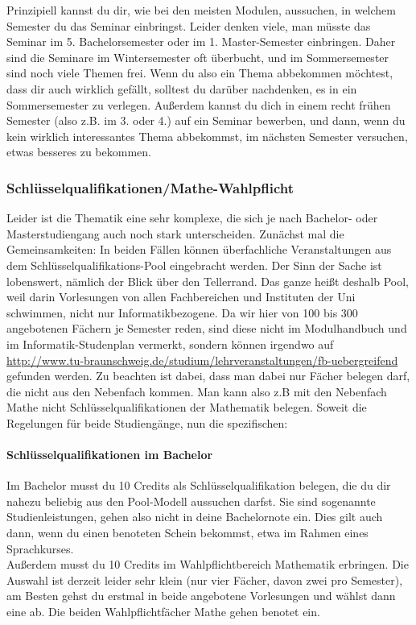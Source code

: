 \begin{multicols}{2}
	Prinzipiell kannst du dir, wie bei den meisten Modulen, aussuchen, in welchem Semester du das Seminar einbringst. Leider denken viele, man müsste das Seminar im 5. Bachelorsemester oder im 1. Master-Semester einbringen. Daher sind die Seminare im Wintersemester oft überbucht, und im Sommersemester sind noch viele Themen frei. Wenn du also ein Thema abbekommen möchtest, dass dir auch wirklich gefällt, solltest du darüber nachdenken, es in ein Sommersemester zu verlegen. Außerdem kannst du dich in einem recht frühen Semester (also z.B. im 3. oder 4.) auf ein Seminar bewerben, und dann, wenn du kein wirklich interessantes Thema abbekommst, im nächsten Semester versuchen, etwas besseres zu bekommen.

	\subsubsection{Schlüsselqualifikationen/Mathe-Wahl\-pflicht}
	Leider ist die Thematik eine sehr komplexe, die sich je nach Bachelor- oder Masterstudiengang auch noch stark unterscheiden. Zunächst mal die Gemeinsamkeiten: In beiden Fällen können überfachliche Veranstaltungen aus dem Schlüsselqualifikations-Pool eingebracht werden. Der Sinn der Sache ist lobenswert, nämlich der Blick über den Tellerrand.  Das ganze heißt deshalb Pool, weil darin Vorlesungen von allen Fachbereichen und Instituten der Uni schwimmen, nicht nur Informatikbezogene. Da wir hier von 100 bis 300 angebotenen Fächern je Semester reden, sind diese nicht im Modulhandbuch und im Informatik-Studenplan vermerkt, sondern können irgendwo auf \url{http://www.tu-braunschweig.de/studium/lehrveranstaltungen/fb-uebergreifend} gefunden werden.   Zu beachten ist dabei, dass man dabei nur Fächer belegen darf, die nicht aus den Nebenfach kommen. Man kann also z.B mit den Nebenfach Mathe nicht Schlüsselqualifikationen der Mathematik belegen. Soweit die Regelungen für beide Studiengänge, nun die spezifischen:

	\paragraph*{Schlüsselqualifikationen im Bachelor}
	Im Bachelor musst du 10 Credits als Schlüsselqualifikation belegen, die du dir nahezu beliebig aus den Pool-Modell aussuchen darfst. Sie sind sogenannte Studienleistungen, gehen also nicht in deine Bachelornote ein. Dies gilt auch dann, wenn du einen benoteten Schein bekommst, etwa im Rahmen eines Sprachkurses.\\
	Außerdem musst du 10 Credits im Wahlpflichtbereich Mathematik erbringen. Die Auswahl ist derzeit leider sehr klein (nur vier Fächer, davon zwei pro Semester), am Besten gehst du erstmal in beide angebotene Vorlesungen und wählst dann eine ab. Die beiden Wahlpflichtfächer Mathe gehen benotet ein.


\end{multicols}
